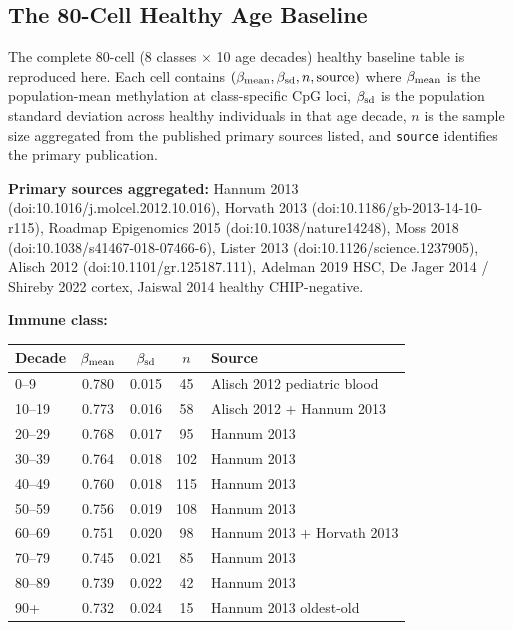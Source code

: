 \documentclass[12pt,a4paper]{article}
\begin{document}
\subsection{The 80-Cell Healthy Age Baseline}
\label{subsec:age_baseline}

The complete 80-cell (8 classes $\times$ 10 age decades) healthy
baseline table is reproduced here. Each cell contains
$(\beta_{\rm mean}, \beta_{\rm sd}, n, \mathrm{source})$ where
$\beta_{\rm mean}$ is the population-mean methylation at class-specific
CpG loci, $\beta_{\rm sd}$ is the population standard deviation across
healthy individuals in that age decade, $n$ is the sample size
aggregated from the published primary sources listed, and
\texttt{source} identifies the primary publication.

{\sloppy
\textbf{Primary sources aggregated:} Hannum 2013
(doi:10.1016/j.molcel.2012.10.016),
Horvath 2013
(doi:10.1186/gb-2013-14-10-r115),
Roadmap Epigenomics 2015
(doi:10.1038/nature14248),
Moss 2018
(doi:10.1038/s41467-018-07466-6),
Lister 2013
(doi:10.1126/science.1237905),
Alisch 2012
(doi:10.1101/gr.125187.111),
Adelman 2019 HSC, De Jager 2014 /
Shireby 2022 cortex, Jaiswal 2014 healthy CHIP-negative.
\par}

\textbf{Immune class:}

\begin{center}
\footnotesize
\begin{tabular}{lcccp{4cm}}
\toprule
Decade & $\beta_{\rm mean}$ & $\beta_{\rm sd}$ & $n$ & Source \\
\midrule
0--9   & 0.780 & 0.015 &  45 & Alisch 2012 pediatric blood \\
10--19 & 0.773 & 0.016 &  58 & Alisch 2012 + Hannum 2013 \\
20--29 & 0.768 & 0.017 &  95 & Hannum 2013 \\
30--39 & 0.764 & 0.018 & 102 & Hannum 2013 \\
40--49 & 0.760 & 0.018 & 115 & Hannum 2013 \\
50--59 & 0.756 & 0.019 & 108 & Hannum 2013 \\
60--69 & 0.751 & 0.020 &  98 & Hannum 2013 + Horvath 2013 \\
70--79 & 0.745 & 0.021 &  85 & Hannum 2013 \\
80--89 & 0.739 & 0.022 &  42 & Hannum 2013 \\
90+    & 0.732 & 0.024 &  15 & Hannum 2013 oldest-old \\
\bottomrule
\end{tabular}
\end{center}
\end{document}
